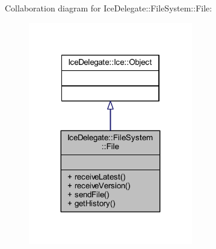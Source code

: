 Collaboration diagram for Ice\+Delegate\+:\+:File\+System\+:\+:File\+:
\nopagebreak
\begin{figure}[H]
\begin{center}
\leavevmode
\includegraphics[width=203pt]{class_ice_delegate_1_1_file_system_1_1_file__coll__graph}
\end{center}
\end{figure}
